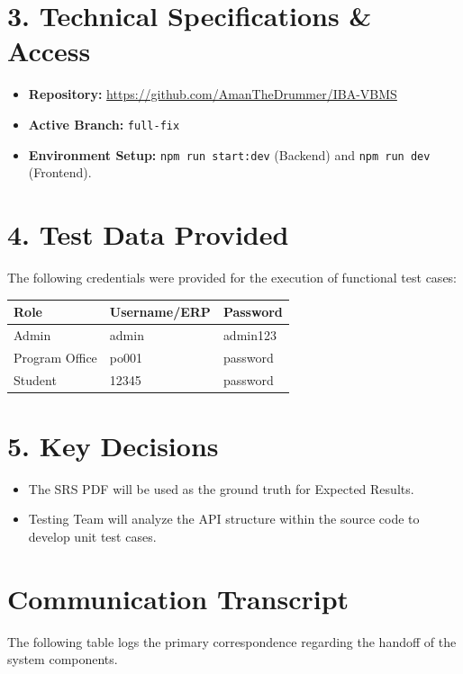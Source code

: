\documentclass[11pt]{article}
\begin{document}
\section*{3. Technical Specifications \& Access}
\begin{itemize}
    \item \textbf{Repository:} \url{https://github.com/AmanTheDrummer/IBA-VBMS}
    \item \textbf{Active Branch:} \texttt{full-fix}
    \item \textbf{Environment Setup:} \texttt{npm run start:dev} (Backend) and \texttt{npm run dev} (Frontend).
\end{itemize}

\section*{4. Test Data Provided}
The following credentials were provided for the execution of functional test cases:
\begin{center}
\begin{tabular}{|l|l|l|}
\hline
\textbf{Role} & \textbf{Username/ERP} & \textbf{Password} \\ \hline
Admin & admin & admin123 \\ \hline
Program Office & po001 & password \\ \hline
Student & 12345 & password \\ \hline
\end{tabular}
\end{center}

\section*{5. Key Decisions}
\begin{itemize}[noitemsep]
    \item The SRS PDF will be used as the ground truth for Expected Results.
    \item Testing Team will analyze the API structure within the source code to develop unit test cases.
\end{itemize}



\section{Communication Transcript}
The following table logs the primary correspondence regarding the handoff of the system components.
\end{document}
